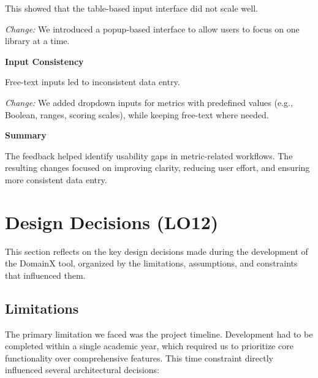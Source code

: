 \documentclass{article}
\begin{document}
This showed that the table-based input interface did not scale well.

\textit{Change:}
We introduced a popup-based interface to allow users to focus on one library at a time.

\vspace{0.2cm}

\textbf{Input Consistency}

Free-text inputs led to inconsistent data entry.

\textit{Change:}
We added dropdown inputs for metrics with predefined values (e.g., Boolean, ranges, scoring scales), while keeping free-text where needed.

\vspace{0.2cm}


\textbf{Summary}

The feedback helped identify usability gaps in metric-related workflows. The resulting changes focused on improving clarity, reducing user effort, and ensuring more consistent data entry.
\section{Design Decisions (LO12)}

This section reflects on the key design decisions made during the development of the DomainX tool, organized by the limitations, assumptions, and constraints that influenced them.

\subsection{Limitations}

The primary limitation we faced was the project timeline. Development had to be completed within a single academic year, which required us to prioritize core functionality over comprehensive features. This time constraint directly influenced several architectural decisions:
\end{document}
